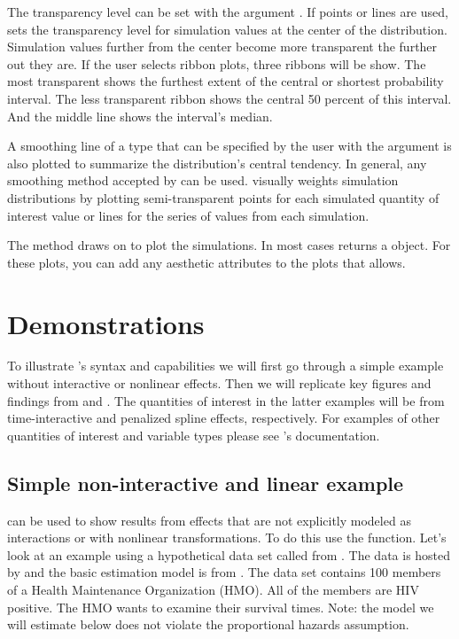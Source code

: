\documentclass[nojss]{jss}\usepackage[]{graphicx}\usepackage[]{color}
\begin{document}
The transparency level can be set with the argument . If points or lines are used,  sets the transparency level for simulation values at the center of the distribution. Simulation values further from the center become more transparent the further out they are. If the user selects ribbon plots, three ribbons will be show. The most transparent shows the furthest extent of the central or shortest probability interval. The less transparent ribbon shows the central 50 percent of this interval. And the middle line shows the interval's median.

A smoothing line of a type that can be specified by the user with the  argument is also plotted to summarize the distribution's central tendency. In general, any smoothing method accepted by  \citep{R-ggplot2} can be used.  visually weights simulation distributions by plotting semi-transparent points for each simulated quantity of interest value or lines for the series of values from each simulation.

The  method draws on  to plot the simulations. In most cases  returns a   object. For these plots, you can add any aesthetic attributes to the plots that  allows.

\section[Demonstrations]{Demonstrations}

To illustrate 's syntax and capabilities we will first go through a simple example without interactive or nonlinear effects. Then we will replicate key figures and findings from \cite{Licht2011} and \cite{Keele2010}. The quantities of interest in the latter examples will be from time-interactive and penalized spline effects, respectively. For examples of other quantities of interest and variable types please see 's documentation.

\subsection{Simple non-interactive and linear example}

 can be used to show results from effects that are not explicitly modeled as interactions or with nonlinear transformations. To do this use the  function. Let's look at an example using a hypothetical data set called  from \cite{hosmer2008}.  The data is hosted by and the basic estimation model is from \cite{UCLAtest}. The data set contains 100 members of a Health Maintenance Organization (HMO). All of the members are HIV positive. The HMO wants to examine their survival times. Note: the model we will estimate below does not violate the proportional hazards assumption.
\end{document}
